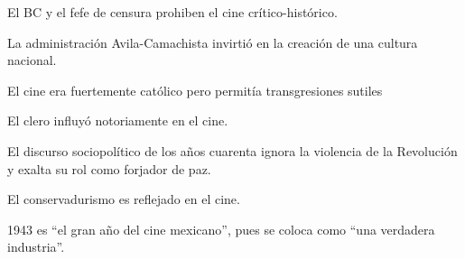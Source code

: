 \begin{compactitem}
\item El BC y el fefe de censura prohiben el cine crítico-histórico.\autocite[179]{guerrero_imagen_2005}
\item La administración Avila-Camachista invirtió en la creación de una cultura nacional.\autocite[35]{tierney_myths_2002}
\item El cine era fuertemente católico pero permitía transgresiones sutiles\autocite[48]{tierney_myths_2002}
\item El clero influyó notoriamente en el cine.\autocite[12]{garcia_riera_historia_1992}
\item El discurso sociopolítico de los años cuarenta ignora la violencia de la Revolución y exalta su rol como forjador de paz.\autocite[370]{sanchez_vi._2010}
\item El conservadurismo es reflejado en el cine.\autocite[179]{guerrero_imagen_2005}

\item 1943 es ``el gran año del cine mexicano'', pues se coloca como ``una verdadera industria''.\autocite[7]{garcia_riera_historia_1992}
\end{compactitem} 



